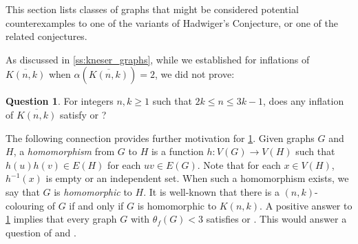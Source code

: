 \documentclass[11pt]{article}
\numberwithin{equation}{section}
\theoremstyle{plain}
\theoremstyle{definition}
\newtheorem{quest}[thm]{Question}
\renewcommand{\geq}{\geqslant}
\renewcommand{\leq}{\leqslant}
\newcommand{\defn}[1]{\textcolor{green!50!black}{\textit{#1}}}
\begin{document}
This section lists classes of graphs that might be considered potential counterexamples to one of the variants of Hadwiger's Conjecture, or one of the related conjectures.

As discussed in \cref{ss:kneser_graphs}, while we established  for inflations of $\overline{K(n,k)}$ when $\alpha(\overline{K(n,k)}) = 2$, we did not prove:
\begin{quest}
    \label{q:kneser}
    For integers $n,k \geq 1$ such that $2k \leq n \leq 3k - 1$, does any inflation of $\overline{K(n,k)}$ satisfy  or ?
\end{quest}
The following connection provides further motivation for \cref{q:kneser}.
Given graphs $G$ and $H$, a \defn{homomorphism} from $G$ to $H$ is a function $h: V(G) \to V(H)$ such that $h(u) h(v) \in E(H)$ for each $uv \in E(G)$. Note that for each $x \in V(H)$, $h^{-1}(x)$ is empty or an independent set. When such a homomorphism exists, we say that $G$ is \defn{homomorphic} to $H$. It is well-known \citep{SU97} that there is a $(n,k)$-colouring of $G$ if and only if $G$ is homomorphic to $K(n,k)$.
A positive answer to \cref{q:kneser} implies that every graph $G$ with $\theta_f(G) < 3$ satisfies  or . This would answer a question of \citet{Blasiak07}  and \citet{CS12}.
\end{document}
